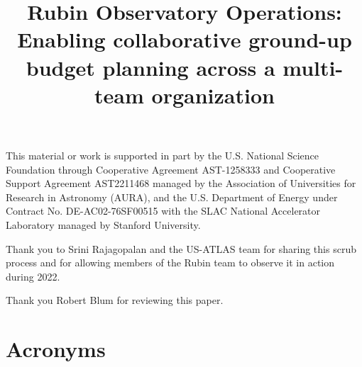 \documentclass[]{spie}
\begin{document}

\title{Rubin Observatory Operations: Enabling collaborative ground-up budget planning across a multi-team organization}


\maketitle






\acknowledgments
This material or work is supported in part by the U.S. National Science Foundation through Cooperative Agreement AST-1258333 and Cooperative Support Agreement AST2211468 managed by the Association of Universities for Research in Astronomy (AURA), and the U.S. Department of Energy under Contract No. DE-AC02-76SF00515 with the SLAC National Accelerator Laboratory managed by Stanford University.

Thank you to Srini Rajagopalan and the US-ATLAS team for sharing this scrub process and for allowing members of the Rubin team to observe it in action during 2022.

Thank you Robert Blum for reviewing this paper.



\pagebreak
\section*{Acronyms} \label{sec:acronyms}

\end{document}
